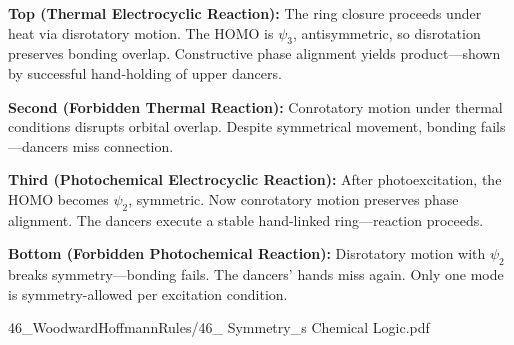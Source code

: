 \begin{SideNotePage}{
  \textbf{Top (Thermal Electrocyclic Reaction):}  
  The ring closure proceeds under heat via disrotatory motion. The HOMO is $\psi_3$, antisymmetric, so disrotation preserves bonding overlap. Constructive phase alignment yields product—shown by successful hand-holding of upper dancers. \par

  \textbf{Second (Forbidden Thermal Reaction):}  
  Conrotatory motion under thermal conditions disrupts orbital overlap. Despite symmetrical movement, bonding fails—dancers miss connection. \par

  \textbf{Third (Photochemical Electrocyclic Reaction):}  
  After photoexcitation, the HOMO becomes $\psi_2$, symmetric. Now conrotatory motion preserves phase alignment. The dancers execute a stable hand-linked ring—reaction proceeds. \par

  \textbf{Bottom (Forbidden Photochemical Reaction):}  
  Disrotatory motion with $\psi_2$ breaks symmetry—bonding fails. The dancers’ hands miss again. Only one mode is symmetry-allowed per excitation condition. \par
}{46_WoodwardHoffmannRules/46_ Symmetry_s Chemical Logic.pdf}
\end{SideNotePage}
